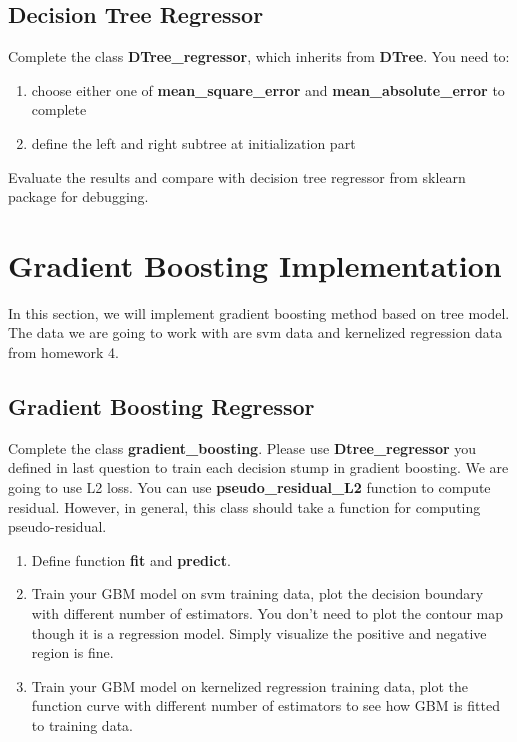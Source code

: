 \documentclass[12pt]{article}
\begin{document}
\subsection{Decision Tree Regressor}
Complete the class \textbf{DTree\_regressor}, which inherits from \textbf{DTree}. You need to: 
\begin{enumerate}
	\item choose either one of \textbf{mean\_square\_error} and \textbf{mean\_absolute\_error} to complete
	\item define the left and right subtree at initialization part
\end{enumerate}
Evaluate the results and compare with decision tree regressor from sklearn package for debugging.

\section{Gradient Boosting Implementation}
In this section, we will implement gradient boosting method based on tree model. The data we are going to work with are svm data and kernelized regression data from homework 4.

\subsection{Gradient Boosting Regressor}
Complete the class \textbf{gradient\_boosting}. Please use \textbf{Dtree\_regressor} you defined in last question to train each decision stump in gradient  boosting. We are going to use L2 loss. You can use \textbf{pseudo\_residual\_L2} function to compute residual. However, in general, this class should take a function for computing pseudo-residual. 
\begin{enumerate}
	\item Define function \textbf{fit} and \textbf{predict}. 
	\item Train your GBM model on svm training data, plot the decision boundary with different number of estimators. You don't need to plot the contour map though it is a regression model. Simply visualize the positive and negative region is fine. 
	\item Train your GBM model on kernelized regression training data, plot the function curve with different number of estimators to see how GBM is fitted to training data.
\end{enumerate}
\end{document}
